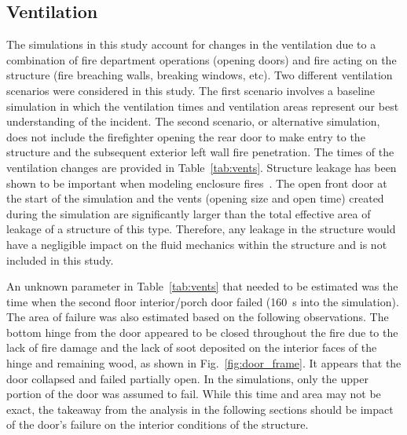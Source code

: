 \subsection{Ventilation}
\label{Vents}
The simulations in this study account for changes in the ventilation due to a combination of fire department operations (opening doors) and fire acting on the structure (fire breaching walls, breaking windows, etc). Two different ventilation scenarios were considered in this study. The first scenario involves a baseline simulation in which the ventilation times and ventilation areas represent our best understanding of the incident. The second scenario, or alternative simulation, does not include the firefighter opening the rear door to make entry to the structure and the subsequent exterior left wall fire penetration. The times of the ventilation changes are provided in Table~\ref{tab:vents}. Structure leakage has been shown to be important when modeling enclosure fires~\cite{beal2009}. The open front door at the start of the simulation and the vents (opening size and open time) created during the simulation are significantly larger than the total effective area of leakage of a structure of this type. Therefore, any leakage in the structure would have a negligible impact on the fluid mechanics within the structure and is not included in this study.

An unknown parameter in Table~\ref{tab:vents} that needed to be estimated was the time when the second floor interior/porch door failed (160~s into the simulation). The area of failure was also estimated based on the following observations. The bottom hinge from the door appeared to be closed throughout the fire due to the lack of fire damage and the lack of soot deposited on the interior faces of the hinge and remaining wood, as shown in Fig.~\ref{fig:door_frame}. It appears that the door collapsed and failed partially open. In the simulations, only the upper portion of the door was assumed to fail. While this time and area may not be exact, the takeaway from the analysis in the following sections should be impact of the door's failure on the interior conditions of the structure.

